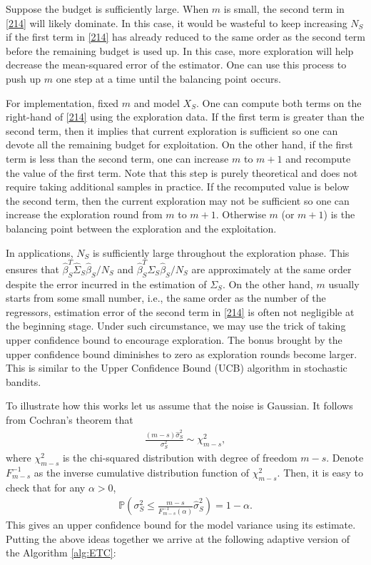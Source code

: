 \documentclass[11pt,a4paper]{amsart}
\numberwithin{equation}{section}
\theoremstyle{plain}
\theoremstyle{definition}
\def\P{{\mathbb P}}
\begin{document}
Suppose the budget is sufficiently large. 
When $m$ is small, the second term in \eqref{214} will likely dominate. 
In this case, it would be wasteful to keep increasing $N_S$ if the first term in \eqref{214} has already reduced to the same order as the second term before the remaining budget is used up. 
In this case, more exploration will help decrease the mean-squared error of the estimator. 
One can use this process to push up $m$ one step at a time until the balancing point occurs. 

For implementation, fixed $m$ and model $X_S$.
One can compute both terms on the right-hand of \eqref{214} using the exploration data.
If the first term is greater than the second term, then it implies that current exploration is sufficient so one can devote all the remaining budget for exploitation.  
On the other hand, if the first term is less than the second term, one can increase $m$ to $m+1$ and recompute the value of the first term. 
Note that this step is purely theoretical and does not require taking additional samples in practice. 
If the recomputed value is below the second term, then the current exploration may not be sufficient so one can increase the exploration round from $m$ to $m+1$. 
Otherwise $m$ (or $m+1$) is the balancing point between the exploration and the exploitation. 

In applications, $N_S$ is sufficiently large throughout the exploration phase. 
This ensures that $\widehat{\beta}_S^T\widehat{\Sigma}_S\widehat{\beta}_S/N_S$ and $\widehat{\beta}_S^T\Sigma_S\widehat{\beta}_S/N_S$ are approximately at the same order despite the error incurred in the estimation of $\Sigma_S$. 
On the other hand, $m$ usually starts from some small number, i.e., the same order as the number of the regressors, estimation error of the second term in \eqref{214} is often not negligible at the beginning stage.  
Under such circumstance, we may use the trick of taking upper confidence bound to encourage exploration.
The bonus brought by the upper confidence bound diminishes to zero as exploration rounds become larger. 
This is similar to the Upper Confidence Bound (UCB) algorithm \cite{auer2002finite} in stochastic bandits. 

To illustrate how this works let us assume that the noise is Gaussian. 
It follows from Cochran's theorem that 
\begin{align}
\frac{(m-s)\widehat{\sigma}^2_S}{\sigma^2_S}\sim\chi^2_{m-s},
\end{align}
where $\chi^2_{m-s}$ is the chi-squared distribution with degree of freedom $m-s$. 
Denote $F_{m-s}^{-1}$ as the inverse cumulative distribution function of $\chi^2_{m-s}$. Then, it is easy to check that for any $\alpha>0$, 
\begin{align}
\P\left(\sigma_S^2\leq \frac{m-s}{F^{-1}_{m-s}(\alpha)}\widehat{\sigma}^2_S\right) = 1-\alpha. \label{chi}
\end{align}
This gives an upper confidence bound for the model variance using its estimate. 
Putting the above ideas together we arrive at the following adaptive version of the Algorithm \ref{alg:ETC}:
\end{document}
